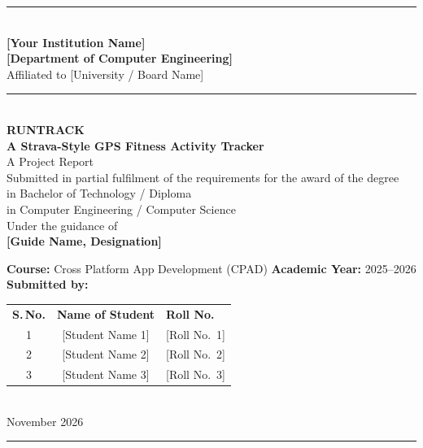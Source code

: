 \documentclass[12pt, a4paper]{report}
\newcommand{\institution}{[Your Institution Name]}
\newcommand{\department}{[Department of Computer Engineering]}
\newcommand{\university}{[University / Board Name]}
\newcommand{\courseTitle}{Cross Platform App Development (CPAD)}
\newcommand{\academicYear}{2025--2026}
\newcommand{\reportDate}{November 2026}
\newcommand{\guideName}{[Guide Name, Designation]}
\begin{document}

\begin{titlepage}
\begin{center}
\vspace*{0.5cm}
{\rule{\textwidth}{1.2pt}}\\[0.4cm]
{\large\bfseries \institution}\\[0.2cm]
{\large\bfseries \department}\\[0.1cm]
{\normalsize Affiliated to \university}\\[0.5cm]
{\rule{\textwidth}{0.6pt}}\\[1.8cm]

{\LARGE\bfseries RUNTRACK}\\[0.5cm]
{\Large\bfseries A Strava-Style GPS Fitness Activity Tracker}\\[1.2cm]

{\large A Project Report}\\[0.3cm]
{\normalsize Submitted in partial fulfilment of the requirements for the award
of the degree}\\[0.15cm]
{\normalsize in Bachelor of Technology / Diploma}\\[0.15cm]
{\normalsize in Computer Engineering / Computer Science}\\[0.8cm]

{\normalsize Under the guidance of}\\[0.3cm]
{\large\bfseries \guideName}\\[1.5cm]

\vfill

{\normalsize \textbf{Course:} \courseTitle \hfill
             \textbf{Academic Year:} \academicYear}\\[0.4cm]
{\normalsize \textbf{Submitted by:}}\\[0.3cm]
\begin{tabular}{@{}ccl@{}}
  \textbf{S.\,No.} & \textbf{Name of Student} & \textbf{Roll No.}\\[2pt]
  1 & [Student Name 1] & [Roll No.\ 1]\\
  2 & [Student Name 2] & [Roll No.\ 2]\\
  3 & [Student Name 3] & [Roll No.\ 3]\\
\end{tabular}\\[1.0cm]
{\normalsize \reportDate}\\[0.5cm]
{\rule{\textwidth}{1.2pt}}
\end{center}
\end{titlepage}
\end{document}
